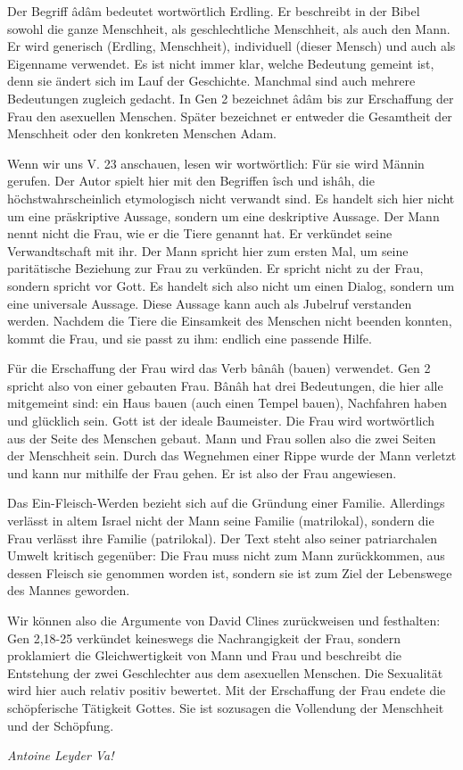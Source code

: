 Der Begriff âdâm bedeutet wortwörtlich Erdling. Er beschreibt in der Bibel sowohl die ganze Menschheit, als geschlechtliche Menschheit, als auch den Mann. Er wird generisch (Erdling, Menschheit), individuell (dieser Mensch) und auch als Eigenname verwendet. Es ist nicht immer klar, welche Bedeutung gemeint ist, denn sie ändert sich im Lauf der Geschichte. Manchmal sind auch mehrere Bedeutungen zugleich gedacht. In Gen 2 bezeichnet âdâm bis zur Erschaffung der Frau den asexuellen Menschen. Später bezeichnet er entweder die Gesamtheit der Menschheit oder den konkreten Menschen Adam.

Wenn wir uns V. 23 anschauen, lesen wir wortwörtlich: Für sie wird Männin gerufen. Der Autor spielt hier mit den Begriffen îsch und ishâh, die höchstwahrscheinlich etymologisch nicht verwandt sind. Es handelt sich hier nicht um eine präskriptive Aussage, sondern um eine deskriptive Aussage. Der Mann nennt nicht die Frau, wie er die Tiere genannt hat. Er verkündet seine Verwandtschaft mit ihr. Der Mann spricht hier zum ersten Mal, um seine paritätische Beziehung zur Frau zu verkünden. Er spricht nicht zu der Frau, sondern spricht vor Gott. Es handelt sich also nicht um einen Dialog, sondern um eine universale Aussage. Diese Aussage kann auch als Jubelruf verstanden werden. Nachdem die Tiere die Einsamkeit des Menschen nicht beenden konnten, kommt die Frau, und sie passt zu ihm: endlich eine passende Hilfe.

Für die Erschaffung der Frau wird das Verb bânâh (bauen) verwendet. Gen 2 spricht also von einer gebauten Frau. Bânâh hat drei Bedeutungen, die hier alle mitgemeint sind: ein Haus bauen (auch einen Tempel bauen), Nachfahren haben und glücklich sein. Gott ist der ideale Baumeister. Die Frau wird wortwörtlich aus der Seite des Menschen gebaut. Mann und Frau sollen also die zwei Seiten der Menschheit sein. Durch das Wegnehmen einer Rippe wurde der Mann verletzt und kann nur mithilfe der Frau gehen. Er ist also der Frau angewiesen.

Das Ein-Fleisch-Werden bezieht sich auf die Gründung einer Familie. Allerdings verlässt in altem Israel nicht der Mann seine Familie (matrilokal), sondern die Frau verlässt ihre Familie (patrilokal). Der Text steht also seiner patriarchalen Umwelt kritisch gegenüber: Die Frau muss nicht zum Mann zurückkommen, aus dessen Fleisch sie genommen worden ist, sondern sie ist zum Ziel der Lebenswege des Mannes geworden.

Wir können also die Argumente von David Clines zurückweisen und festhalten: Gen 2,18-25 verkündet keineswegs die Nachrangigkeit der Frau, sondern proklamiert die Gleichwertigkeit von Mann und Frau und beschreibt die Entstehung der zwei Geschlechter aus dem asexuellen Menschen. Die Sexualität wird hier auch relativ positiv bewertet. Mit der Erschaffung der Frau endete die schöpferische Tätigkeit Gottes. Sie ist sozusagen die Vollendung der Menschheit und der Schöpfung.


	\begin{flushright}
		\hfill\emph{Antoine Leyder Va!}
	\end{flushright}

%
